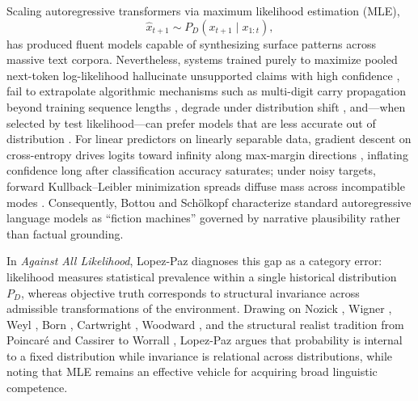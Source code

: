 \documentclass[11pt,a4paper]{article}
\theoremstyle{definition}
\theoremstyle{remark}
\begin{document}
Scaling autoregressive transformers via maximum likelihood estimation (MLE),
\begin{equation}
  \hat{x}_{t+1} \sim P_D(x_{t+1} \mid x_{1:t}),
  \label{eq:mle}
\end{equation}
has produced fluent models capable of synthesizing surface patterns across massive text corpora. Nevertheless, systems trained purely to maximize pooled next-token log-likelihood hallucinate unsupported claims with high confidence \cite{kalai2026evaluating,manakul2023selfcheckgpt}, fail to extrapolate algorithmic mechanisms such as multi-digit carry propagation beyond training sequence lengths \cite{ahuja2024provable,lopezpaz2026against}, degrade under distribution shift \cite{yuan2023revisiting}, and---when selected by test likelihood---can prefer models that are less accurate out of distribution \cite{velickovic2026perplexity}. For linear predictors on linearly separable data, gradient descent on cross-entropy drives logits toward infinity along max-margin directions \cite{soudry2018implicit}, inflating confidence long after classification accuracy saturates; under noisy targets, forward Kullback--Leibler minimization spreads diffuse mass across incompatible modes \cite{theis2016note,lopezpaz2026against}. Consequently, Bottou and Sch\"olkopf \cite{bottou2025fiction} characterize standard autoregressive language models as ``fiction machines'' governed by narrative plausibility rather than factual grounding.

In \emph{Against All Likelihood}, Lopez-Paz \cite{lopezpaz2026against} diagnoses this gap as a category error: likelihood measures statistical prevalence within a single historical distribution $P_D$, whereas objective truth corresponds to structural invariance across admissible transformations of the environment. Drawing on Nozick \cite{nozick2001invariances}, Wigner \cite{wigner1967symmetries}, Weyl \cite{weyl1952symmetry}, Born \cite{born1953physical}, Cartwright \cite{cartwright1983laws}, Woodward \cite{woodward2003making}, and the structural realist tradition from Poincar\'e \cite{poincare1905science} and Cassirer \cite{cassirer1923substance,french2001symmetry} to Worrall \cite{worrall1989structural}, Lopez-Paz argues that probability is internal to a fixed distribution while invariance is relational across distributions, while noting that MLE remains an effective vehicle for acquiring broad linguistic competence.
\end{document}
